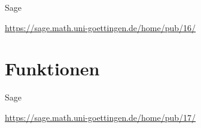 \documentclass[hyperref={xetex}]{beamer}
\begin{document}
%
%
%


\begin{frame}{Sage}
\begin{center}
\url{https://sage.math.uni-goettingen.de/home/pub/16/}
\end{center}
\end{frame}

\section{Funktionen}

\begin{frame}{Sage}
\begin{center}
\url{https://sage.math.uni-goettingen.de/home/pub/17/}
\end{center}
\end{frame}
\end{document}
